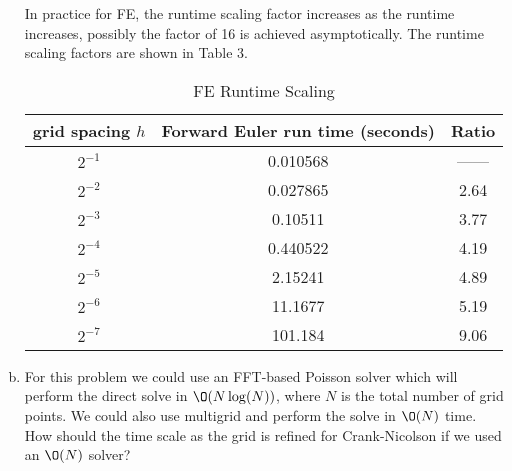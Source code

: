 \documentclass[12pt]{article}
\begin{document}
\begin{enumerate}[(a)]
In practice for FE, the runtime scaling factor increases as the runtime increases, possibly the factor of 16 is achieved asymptotically.  The runtime scaling factors are shown in Table 3.
\begin{table}[H]
\caption{FE Runtime Scaling}
\centering\begin{tabular}{||c|c|c||}
\hline \hline
   grid spacing $h$ &  Forward Euler run time (seconds) & Ratio \\
\hline
    $2^{-1}$ &               0.010568                 & ------ \\
    $2^{-2}$ &               0.027865                 & 2.64 \\
    $2^{-3}$ &               0.10511                  & 3.77 \\
    $2^{-4}$ &               0.440522                 & 4.19 \\
    $2^{-5}$ &               2.15241                  & 4.89 \\
    $2^{-6}$ &               11.1677                  & 5.19 \\
    $2^{-7}$ &               101.184                  & 9.06 \\
\hline \hline
\end{tabular}
\end{table}

\item  For this problem we could use an FFT-based Poisson solver which will perform the direct solve in $\O(N \log(N))$, where $N$ is the total number of grid points. We could also use multigrid and perform the solve in $\O(N)$ time. How should the time scale as the grid is refined for Crank-Nicolson if we used an $\O(N)$ solver?


\end{enumerate}
\end{document}
